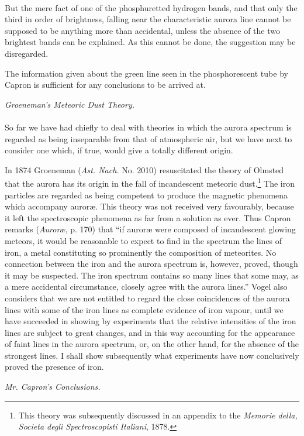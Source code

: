\documentclass[a4paper, 12pt, oneside, polutonikogreek, english]{article}
\begin{document}
\paragraph{}
But the mere fact of one of the phosphuretted hydrogen bands, and that only the third in order of brightness, falling near the characteristic aurora line cannot be supposed to be anything more than accidental, unless the absence of the two brightest bands can be explained. As this cannot be done, the suggestion may be disregarded.

The information given about the green line seen in the phosphorescent tube by Capron is sufficient for any conclusions to be arrived at.
\begin{center}
\emph{Groeneman's Meteoric Dust Theory.}
\end{center}
\paragraph{}
So far we have had chiefly to deal with theories in which the aurora spectrum is regarded as being inseparable from that of atmospheric air, but we have next to consider one which, if true, would give a totally different origin.

In 1874 Groeneman (\emph{Ast. Nach.} No. 2010) resuscitated the theory of Olmsted that the aurora has its origin in the fall of incandescent meteoric dust.\footnote{This theory was subsequently discussed in an appendix to the \emph{Memorie della, Societa degli Spectroscopisti Italiani}, 1878.} The iron particles are regarded as being competent to produce the magnetic phenomena which accompany auroræ. This theory was not received very favourably, because it left the spectroscopic phenomena as far from a solution as ever. Thus Capron remarks (\emph{Auroræ}, p. 170) that ``if auroræ were composed of incandescent glowing meteors, it would be reasonable to expect to find in the spectrum the lines of iron, a metal constituting so prominently the composition of meteorites. No connection between the iron and the aurora spectrum is, however, proved, though it may be suspected. The iron spectrum contains so many lines that some may, as a mere accidental circumstance, closely agree with the aurora lines.'' Vogel also considers that we are not entitled to regard the close coincidences of the aurora lines with some of the iron lines as complete evidence of iron vapour, until we have succeeded in showing by experiments that the relative intensities of the iron lines are subject to great changes, and in this way accounting for the appearance of faint lines in the aurora spectrum, or, on the other hand, for the absence of the strongest lines. I shall show subsequently what experiments have now conclusively proved the presence of iron.
\begin{center}
\emph{Mr. Capron's Conclusions.}
\end{center}
\end{document}
